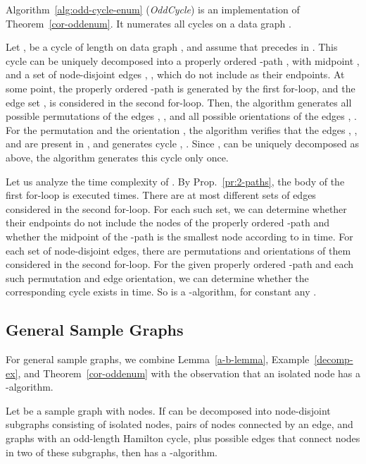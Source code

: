 Algorithm~\ref{alg:odd-cycle-enum} ({\em OddCycle})  is an implementation  of Theorem~\ref{cor-oddenum}.  It numerates all cycles  on a data graph .

\begin{example}
Let ,  be a cycle of length  on data graph , and assume that  precedes  in . This cycle can be uniquely decomposed into a properly ordered -path , with midpoint , and a set of  node-disjoint edges , , which do not include  as their endpoints.
At some point, the properly ordered -path  is generated by the first for-loop, and the edge set ,  is considered in the second for-loop.
Then, the algorithm generates all possible permutations  of the edges , , and all possible orientations  of the edges , .
For the permutation  and the orientation , the algorithm verifies that the edges , , and  are present in , and generates cycle , .
Since ,  can be uniquely decomposed as above, the algorithm generates this cycle only once.
\end{example}

Let us analyze the time complexity of .  By Prop.~\ref{pr:2-paths}, the body of the first for-loop is executed  times. There are at most  different sets of  edges considered in the second for-loop. For each such set, we can determine whether their endpoints do not include the nodes of the properly ordered -path and whether the midpoint of the -path is the smallest node according to  in  time. For each set of  node-disjoint edges, there are  permutations and  orientations of them considered in the second for-loop. For the given properly ordered -path and each such permutation and edge orientation, we can determine whether the corresponding cycle exists in  time. So  is a -algorithm, for constant any .



\subsection{General Sample Graphs}

For general sample graphs, we combine  Lemma~\ref{a-b-lemma}, Example~\ref{decomp-ex}, and Theorem~\ref{cor-oddenum} with the observation that an isolated node has a -algorithm.

\begin{theorem}\label{gen-enum-th}
Let  be a sample graph with  nodes. If  can be decomposed into node-disjoint subgraphs consisting of  isolated nodes, pairs of nodes connected by an edge, and
graphs with an odd-length Hamilton cycle, plus possible edges that connect nodes in two of these subgraphs, then  has a -algorithm.
\end{theorem}

